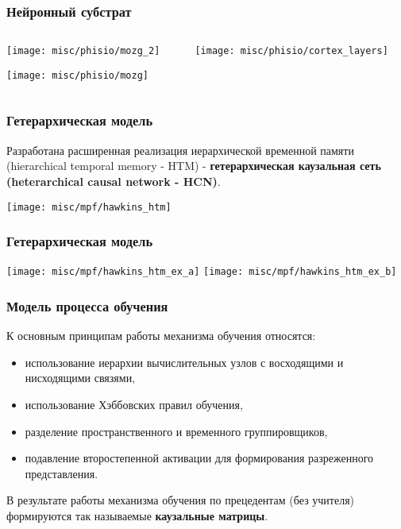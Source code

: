 \documentclass[default]{beamer}
\begin{document}
	\begin{frame}
		\frametitle{Нейронный субстрат}
		
		\begin{columns}
			\begin{column}{0.35\textwidth}
				\texttt{[image: misc/phisio/mozg\_2]}
				\par\bigskip
				\hspace{-7mm}\texttt{[image: misc/phisio/mozg]}
			\end{column}
			\begin{column}{0.65\textwidth}
				\texttt{[image: misc/phisio/cortex\_layers]}
			\end{column}
		\end{columns}
		\nocite{*}
		\printbibliography[keyword={column}, resetnumbers=true]
	\end{frame}

	
	\begin{frame}
		\frametitle{Гетерархическая модель}
		
		Разработана расширенная реализация иерархической временной памяти (hierarchical temporal memory - HTM) - \textbf{гетерархическая каузальная сеть (heterarchical causal network - HCN)}.
		
		\begin{center}
			\texttt{[image: misc/mpf/hawkins\_htm]}
		\end{center}

	\end{frame}

	\begin{frame}
		\frametitle{Гетерархическая модель}

		\begin{center}
			\texttt{[image: misc/mpf/hawkins\_htm\_ex\_a]}
			\texttt{[image: misc/mpf/hawkins\_htm\_ex\_b]}
		\end{center}
		\nocite{*}
		\printbibliography[keyword={hetermem}, resetnumbers=true]
	\end{frame}
	
	\begin{frame}
		\frametitle{Модель процесса обучения}
		
		К основным принципам работы механизма обучения относятся: 
		
		\begin{itemize}
			\item использование иерархии вычислительных узлов с восходящими и нисходящими связями, 
			\item использование Хэббовских правил обучения, 
			\item разделение пространственного и временного группировщиков, 
			\item подавление второстепенной активации для формирования разреженного представления.
		\end{itemize}
		
		В результате работы механизма обучения по прецедентам (без учителя) формируются так называемые \textbf{каузальные матрицы}.
		\vfill
		\nocite{*}
		\printbibliography[keyword={htmlearn}, resetnumbers=true]
	\end{frame}	
	
\end{document}

